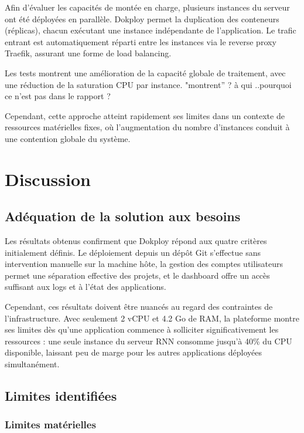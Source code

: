 \documentclass{rapportClass} %
\begin{document}
Afin d’évaluer les capacités de montée en charge, plusieurs instances
du serveur ont été déployées en parallèle.
Dokploy permet la duplication des conteneurs (réplicas), chacun
exécutant une instance indépendante de l’application.
Le trafic entrant est automatiquement réparti entre les instances via
le reverse proxy Traefik, assurant une forme de load balancing.

Les tests montrent une amélioration de la capacité globale de
traitement, avec une réduction de la saturation CPU par instance.
{\color{red} "montrent'' ? à qui ..pourquoi ce n'est pas dans le rapport ?}


Cependant, cette approche atteint rapidement ses limites dans un
contexte de ressources matérielles fixes, où l’augmentation du nombre
d’instances conduit à une contention globale du système.


\chapter{Discussion}

\section{Adéquation de la solution aux besoins}

Les résultats obtenus confirment que Dokploy répond aux quatre critères
initialement définis. Le déploiement depuis un dépôt Git s'effectue
sans intervention manuelle sur la machine hôte, la gestion des comptes
utilisateurs permet une séparation effective des projets, et le
dashboard offre un accès suffisant aux logs et à l'état des
applications.

Cependant, ces résultats doivent être nuancés au regard des contraintes
de l'infrastructure. Avec seulement 2 vCPU et 4.2 Go de RAM, la
plateforme montre ses limites dès qu'une application commence à
solliciter significativement les ressources : une seule instance du
serveur RNN consomme jusqu'à 40\% du CPU disponible, laissant peu de marge
pour les autres applications déployées simultanément.

\section{Limites identifiées}

\subsection{Limites matérielles}
\end{document}
